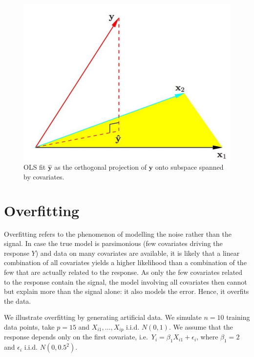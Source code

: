 \documentclass[
]{book}
\begin{document}
\begin{figure}

{\centering \includegraphics[width=0.8\linewidth]{ols_geom1} 

}

\caption{OLS fit $\hat{\textbf{y}}$ as the orthogonal projection of $\textbf{y}$ onto subspace spanned by covariates.}\label{fig:olsgeom1}
\end{figure}

\hypertarget{overfitting}{%
\section{Overfitting}\label{overfitting}}

Overfitting refers to the phenomenon of modelling the noise rather than the signal. In case the true model is parsimonious (few covariates driving the response \(Y\)) and data on many covariates are available, it is likely that a linear combination of all covariates yields a higher likelihood than a combination of the few that are actually related to the response. As only the few covariates related to the response contain the signal, the model involving all covariates then cannot
but explain more than the signal alone: it also models the error. Hence, it overfits the data.

We illustrate overfitting by generating artificial data.
We simulate \(n=10\) training data points, take \(p=15\) and \(X_{i1},\ldots,X_{ip}\) i.i.d. \(N(0,1)\). We assume that the response depends only on the first covariate, i.e.~\(Y_i=\beta_1 X_{i1}+\epsilon_i\), where \(\beta_1=2\) and \(\epsilon_i\) i.i.d. \(N(0,0.5^2)\).
\end{document}
